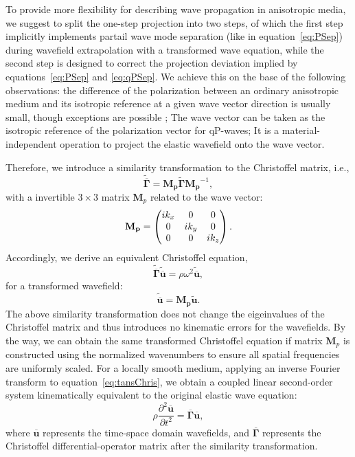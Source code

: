 To provide more flexibility for describing wave propagation in anisotropic media, we suggest to split
the one-step projection into two steps, of which the first step
implicitly implements partail wave mode separation (like in equation~\ref{eq:PSep}) during wavefield
extrapolation with a transformed wave equation, while the second step is designed to correct the
projection deviation implied by equations~\ref{eq:PSep} and \ref{eq:qPSep}.
We achieve this on the base of the following observations:
 the difference of the polarization between an ordinary anisotropic medium and its isotropic reference 
at a given wave vector direction is usually
 small, though exceptions are possible \cite[]{thomsen:1986, tsvankin.chesnokov:1990}; The wave vector can be
taken as the isotropic reference of the polarization vector for qP-waves; It is a material-independent
operation to project the elastic wavefield onto the wave vector.

Therefore, we introduce a similarity transformation to the Christoffel matrix, i.e.,
\begin{equation}
\label{eq:tansChrisM}
\widetilde{\overline{\mathbf{\Gamma}}} = \mathbf{M_p}\widetilde{\mathbf{\Gamma}}\mathbf{M_p}^{-1},
\end{equation}
with a invertible $3\times3$ matrix $\mathbf{M}_{p}$ related to the wave vector:
\begin{equation}
\label{eq:tansM}
\mathbf{M_p}=
\begin{pmatrix}i{k_x} & 0 &0 \cr
         0 & i{k_y} &0 \cr
         0 & 0 & i{k_z}\end{pmatrix}.
\end{equation}
Accordingly, we derive an equivalent Christoffel equation,
\begin{equation}
\label{eq:tansChris}
\widetilde{\overline{\mathbf{\Gamma}}}\widetilde{\overline{\mathbf{u}}} = \rho{\omega}^2\widetilde{\overline{\mathbf{u}}},
\end{equation}
for a transformed wavefield:
\begin{equation}
\label{eq:similarT}
\widetilde{\overline{\mathbf{u}}} = \mathbf{M_p}\widetilde{\mathbf{u}}.
\end{equation}
The above similarity transformation does not change the eigeinvalues of the Christoffel matrix and thus 
introduces no kinematic errors for the wavefields. By the way, we can obtain 
the same transformed Christoffel equation if matrix $\mathbf{M}_{p}$ is constructed using the normalized wavenumbers
to ensure all spatial frequencies are uniformly scaled.
For a locally smooth medium, applying an inverse Fourier transform to
equation~\ref{eq:tansChris}, we obtain a coupled
 linear second-order system kinematically equivalent to the original elastic wave equation:
\begin{equation}
\label{eq:tansElastic}
\rho\frac{\partial^2\overline{\mathbf{u}}}{\partial t^2} = \overline{\mathbf{\Gamma}}\overline{\mathbf{u}},
\end{equation}
where $\overline{\mathbf{u}}$ represents the time-space domain wavefields, and $\overline{\mathbf{\Gamma}}$
 represents the Christoffel differential-operator matrix after the similarity transformation.


